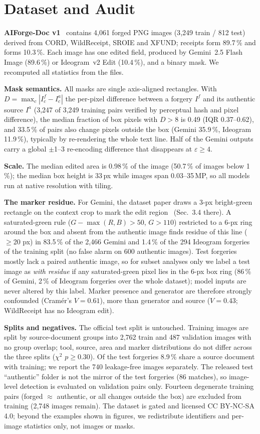 \section{Dataset and Audit}
\label{sec:data}
\textbf{AIForge-Doc v1}~\cite{wu2026aiforgedoc} contains 4{,}061 forged PNG images (3{,}249 train / 812 test) derived from CORD, WildReceipt, SROIE and XFUND; receipts form 89.7\,\% and forms 10.3\,\%. Each image has one edited field, produced by Gemini~2.5 Flash Image (89.6\,\%) or Ideogram~v2 Edit (10.4\,\%), and a binary mask. We recomputed all statistics from the files.

\textbf{Mask semantics.} All masks are single axis-aligned rectangles. With $D=\max_c|I^{f}_c-I^{a}_c|$ the per-pixel difference between a forgery $I^f$ and its authentic source $I^a$ (3{,}247 of 3{,}249 training pairs verified by perceptual hash and pixel difference), the median fraction of box pixels with $D>8$ is 0.49 (IQR 0.37--0.62), and 33.5\,\% of pairs also change pixels outside the box (Gemini 35.9\,\%, Ideogram 11.9\,\%), typically by re-rendering the whole text line. Half of the Gemini outputs carry a global $\pm$1--3 re-encoding difference that disappears at $\varepsilon\ge4$.

\textbf{Scale.} The median edited area is 0.98\,\% of the image (50.7\,\% of images below 1\,\%); the median box height is 33\,px while images span 0.03--35\,MP, so all models run at native resolution with tiling.

\textbf{The marker residue.} For Gemini, the dataset paper draws a 3-px bright-green rectangle on the context crop to mark the edit region~\cite{wu2026aiforgedoc} (Sec.~3.4 there). A saturated-green rule ($G-\max(R,B)>50$, $G>110$) restricted to a 6-px ring around the box and absent from the authentic image finds residue of this line ($\ge$20 px) in 83.5\,\% of the 2{,}466 Gemini and 1.4\,\% of the 294 Ideogram forgeries of the training split (no false alarm on 600 authentic images). Test forgeries mostly lack a paired authentic image, so for subset analyses only we label a test image as \emph{with residue} if any saturated-green pixel lies in the 6-px box ring (86\,\% of Gemini, 2\,\% of Ideogram forgeries over the whole dataset); model inputs are never altered by this label. Marker presence and generator are therefore strongly confounded (Cram\'er's $V=0.61$), more than generator and source ($V=0.43$; WildReceipt has no Ideogram edit).

\textbf{Splits and negatives.} The official test split is untouched. Training images are split by source-document groups into 2{,}762 train and 487 validation images with no group overlap; tool, source, area and marker distributions do not differ across the three splits ($\chi^2$ $p\ge0.30$). Of the test forgeries 8.9\,\% share a source document with training; we report the 740 leakage-free images separately. The released test ``authentic'' folder is not the mirror of the test forgeries (86 matches), so image-level detection is evaluated on validation pairs only. Fourteen degenerate training pairs (forged $\approx$ authentic, or all changes outside the box) are excluded from training (2{,}748 images remain). The dataset is gated and licensed CC BY-NC-SA 4.0; beyond the examples shown in figures, we redistribute identifiers and per-image statistics only, not images or masks.
